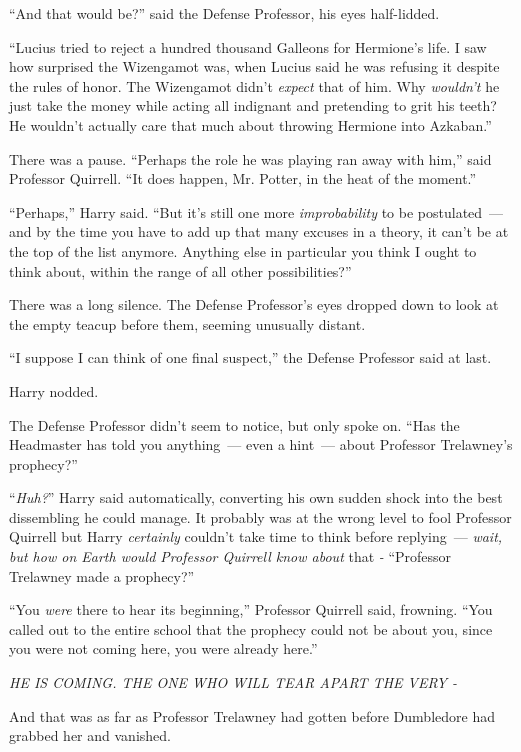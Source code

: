 ``And that would be?'' said the Defense Professor, his eyes half-lidded.

``Lucius tried to reject a hundred thousand Galleons for Hermione's life. I saw how surprised the Wizengamot was, when Lucius said he was refusing it despite the rules of honor. The Wizengamot didn't \emph{expect} that of him. Why \emph{wouldn't} he just take the money while acting all indignant and pretending to grit his teeth? He wouldn't actually care that much about throwing Hermione into Azkaban.''

There was a pause. ``Perhaps the role he was playing ran away with him,'' said Professor Quirrell. ``It does happen, Mr. Potter, in the heat of the moment.''

``Perhaps,'' Harry said. ``But it's still one more \emph{improbability} to be postulated~--- and by the time you have to add up that many excuses in a theory, it can't be at the top of the list anymore. Anything else in particular you think I ought to think about, within the range of all other possibilities?''

There was a long silence. The Defense Professor's eyes dropped down to look at the empty teacup before them, seeming unusually distant.

``I suppose I can think of one final suspect,'' the Defense Professor said at last.

Harry nodded.

The Defense Professor didn't seem to notice, but only spoke on. ``Has the Headmaster has told you anything~--- even a hint~--- about Professor Trelawney's prophecy?''

``\emph{Huh?}'' Harry said automatically, converting his own sudden shock into the best dissembling he could manage. It probably was at the wrong level to fool Professor Quirrell but Harry \emph{certainly} couldn't take time to think before replying~--- \emph{wait, but how on Earth would Professor Quirrell know about} that \emph{-} ``Professor Trelawney made a prophecy?''

``You \emph{were} there to hear its beginning,'' Professor Quirrell said, frowning. ``You called out to the entire school that the prophecy could not be about you, since you were not coming here, you were already here.''

\emph{HE IS COMING. THE ONE WHO WILL TEAR APART THE VERY -}

And that was as far as Professor Trelawney had gotten before Dumbledore had grabbed her and vanished.

